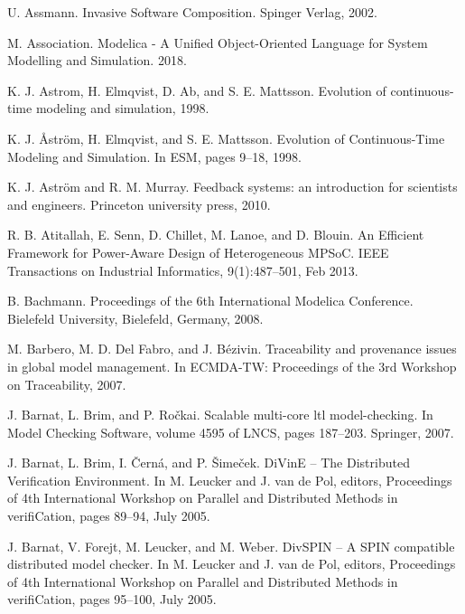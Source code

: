 \begin{description}[style=nextline,leftmargin=12mm,labelwidth=10mm,font=\normalfont]
\item[{[12]}] U. Assmann. Invasive Software Composition. Spinger Verlag, 2002.

\item[{[13]}] M. Association. Modelica - A Unified Object-Oriented Language for System Modelling and Simulation. 2018.

\item[{[14]}] K. J. Astrom, H. Elmqvist, D. Ab, and S. E. Mattsson. Evolution of continuous-time modeling and simulation, 1998.

\item[{[15]}] K. J. Åström, H. Elmqvist, and S. E. Mattsson. Evolution of Continuous-Time Modeling and Simulation. In ESM, pages 9–18, 1998.

\item[{[16]}] K. J. Aström and R. M. Murray. Feedback systems: an introduction for scientists and engineers. Princeton university press, 2010.

\item[{[17]}] R. B. Atitallah, E. Senn, D. Chillet, M. Lanoe, and D. Blouin. An Efficient Framework for Power-Aware Design of Heterogeneous MPSoC. IEEE Transactions on Industrial Informatics, 9(1):487–501, Feb 2013.

\item[{[18]}] B. Bachmann. Proceedings of the 6th International Modelica Conference. Bielefeld University, Bielefeld, Germany, 2008.

\item[{[19]}] M. Barbero, M. D. Del Fabro, and J. Bézivin. Traceability and provenance issues in global model management. In ECMDA-TW: Proceedings of the 3rd Workshop on Traceability, 2007.

\item[{[20]}] J. Barnat, L. Brim, and P. Ročkai. Scalable multi-core ltl model-checking. In Model Checking Software, volume 4595 of LNCS, pages 187–203. Springer, 2007.

\item[{[21]}] J. Barnat, L. Brim, I. Černá, and P. Šimeček. DiVinE – The Distributed Verification Environment. In M. Leucker and J. van de Pol, editors, Proceedings of 4th International Workshop on Parallel and Distributed Methods in verifiCation, pages 89–94, July 2005.

\item[{[22]}] J. Barnat, V. Forejt, M. Leucker, and M. Weber. DivSPIN – A SPIN compatible distributed model checker. In M. Leucker and J. van de Pol, editors, Proceedings of 4th International Workshop on Parallel and Distributed Methods in verifiCation, pages 95–100, July 2005.


\end{description}
